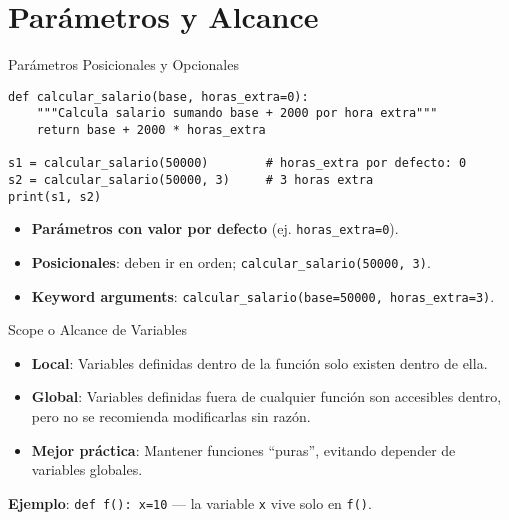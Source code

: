 \documentclass[10pt]{beamer}
\begin{document}
\section{Parámetros y Alcance}

\begin{frame}[fragile]{Parámetros Posicionales y Opcionales}
\begin{verbatim}
def calcular_salario(base, horas_extra=0):
    """Calcula salario sumando base + 2000 por hora extra"""
    return base + 2000 * horas_extra

s1 = calcular_salario(50000)        # horas_extra por defecto: 0
s2 = calcular_salario(50000, 3)     # 3 horas extra
print(s1, s2)
\end{verbatim}
\begin{itemize}
  \item \textbf{Parámetros con valor por defecto} (ej. \texttt{horas\_extra=0}).
  \item \textbf{Posicionales}: deben ir en orden; \texttt{calcular\_salario(50000, 3)}.
  \item \textbf{Keyword arguments}: \texttt{calcular\_salario(base=50000, horas\_extra=3)}.
\end{itemize}
\end{frame}

\begin{frame}{Scope o Alcance de Variables}
  \begin{itemize}
    \item \textbf{Local}: Variables definidas dentro de la función solo existen dentro de ella.
    \item \textbf{Global}: Variables definidas fuera de cualquier función son accesibles dentro, pero no se recomienda modificarlas sin razón.
    \item \textbf{Mejor práctica}: Mantener funciones “puras”, evitando depender de variables globales.
  \end{itemize}
  \vspace{0.2cm}
  \textbf{Ejemplo}: \texttt{def f(): x=10} — la variable \texttt{x} vive solo en \texttt{f()}.
\end{frame}
\end{document}
